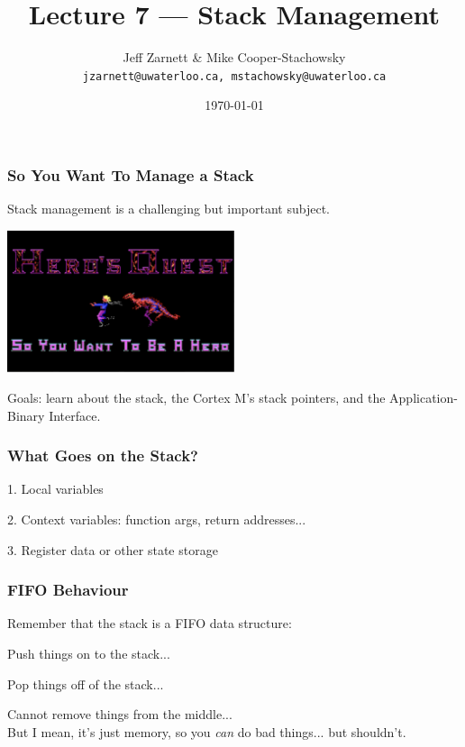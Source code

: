 

\title{Lecture 7 --- Stack Management }

\author{Jeff Zarnett \& Mike Cooper-Stachowsky \\ \small \texttt{jzarnett@uwaterloo.ca, mstachowsky@uwaterloo.ca}}
\date{\today}




\begin{frame}
	\titlepage

\end{frame}


\begin{frame}
\frametitle{So You Want To Manage a Stack}

Stack management is a challenging but important subject.

\begin{center}
	\includegraphics[width=0.5\textwidth]{images/herosquest.png}
\end{center}

Goals: learn about the stack, the Cortex M's stack pointers, and the Application-Binary Interface.


\end{frame}


\begin{frame}
\frametitle{What Goes on the Stack?}

1. Local variables

2. Context variables: function args, return addresses...

3. Register data or other state storage

\end{frame}


\begin{frame}
\frametitle{FIFO Behaviour}

Remember that the stack is a FIFO data structure:

\alert{Push} things on to the stack...

\alert{Pop} things off of the stack...

Cannot remove things from the middle...\\
\quad But I mean, it's just memory, so you \textit{can} do bad things... but shouldn't.


\end{frame}



